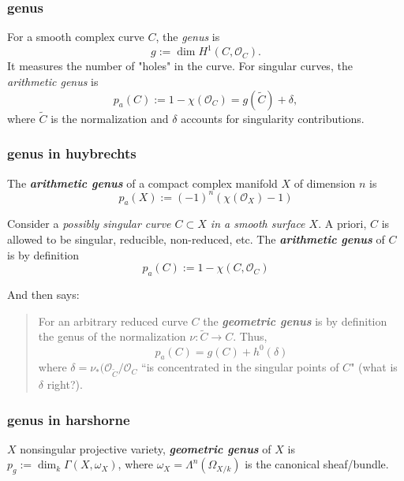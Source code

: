 \subsubsection{genus}
For a smooth complex curve \( C \), the \emph{genus} is
\[
g := \dim H^1(C, \mathcal{O}_C).
\]
It measures the number of "holes" in the curve. For singular curves, the \emph{arithmetic genus} is
\[
p_a(C) := 1 - \chi(\mathcal{O}_C) = g(\widetilde{C}) + \delta,
\]
where \( \widetilde{C} \) is the normalization and \( \delta \) accounts for singularity contributions.

\subsubsection*{genus in huybrechts}
\begin{defn}\leavevmode
The \textit{\textbf{arithmetic genus}} of a compact complex manifold \(X\) of dimension \(n\) is
\[\boxed{p_a(X):=(-1)^n (\chi(\mathcal{O}_X)-1)}\]
\end{defn}

\begin{defn}\leavevmode
	Consider a \textit{possibly singular curve \(C \subset X\) in a smooth surface \(X\)}. A priori, \(C\) is allowed to be singular, reducible, non-reduced, etc. The \textit{\textbf{arithmetic genus}} of \(C\) is by definition
	\[\boxed{p_a(C):= 1 - \chi(C, \mathcal{O}_C)}\]
\end{defn}

And then \cite{huk} says:
\begin{quotation}
For an arbitrary reduced curve \(C\) the \textit{\textbf{geometric genus}} is by definition the genus of the normalization \(\nu:\tilde{C} \to C\). Thus, \[\boxed{p_a(C)=g(C)+h^{0}(\delta)}\]
where \(\delta=\nu_*(\mathcal{O}_{\tilde{C}}/\mathcal{O}_C\) ``is concentrated in the singular points of \(C\)" (what is \(\delta\) right?).
\end{quotation}

\subsubsection*{genus in harshorne}
\begin{defn}\leavevmode
\(X\) nonsingular projective variety, \textit{\textbf{geometric genus}} of \(X\) is \(p_g:=\dim_k\Gamma(X,\omega_X)\), where \(\omega_X=\Lambda^{n}(\Omega_{X/k})\) is the canonical sheaf/bundle.
\end{defn}

